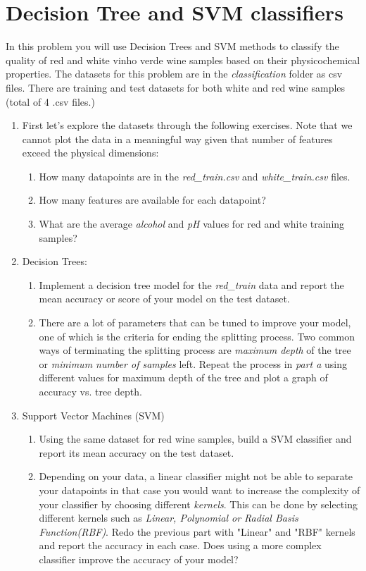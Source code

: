 \documentclass[12pt]{article}
\newenvironment{problem}[2][Problem:]{\begin{trivlist}
\item[\hskip \labelsep {\bfseries #1}\hskip \labelsep {\bfseries #2.}]}{\end{trivlist}}
\begin{document}
\pagebreak


\section{Decision Tree and SVM classifiers}
\begin{problem}{Classification [25 points]}
In this problem you will use Decision Trees and SVM methods to classify the quality of red and white vinho verde wine samples based on their physicochemical properties. The datasets for this problem are in the \textit{classification} folder as csv files. There are training and test datasets for both white and red wine samples (total of 4 .csv files.) 

\begin{enumerate}
	\item First let's explore the datasets through the following exercises. Note that we cannot plot the data in a meaningful way given that  number of features exceed the physical dimensions:
	\begin{enumerate}
		\item How many datapoints are in the \textit{red\_train.csv} and \textit{white\_train.csv} files.
		\item How many features are available for each datapoint?
		\item What are the average \textit{alcohol} and \textit{pH} values for red and white training samples?
	\end{enumerate}
	\item Decision Trees:
	\begin{enumerate}
		\item Implement a decision tree model for the \textit{red\_train} data and report the mean accuracy or score of your model on the test dataset.
		\item There are a lot of parameters that can be tuned to improve your model, one of which is the criteria for ending the splitting process. Two common ways of terminating the splitting process are \textit{maximum depth} of the tree or \textit{minimum number of samples} left. Repeat the process in \textit{part a} using different values for maximum depth of the tree and plot a graph of accuracy vs. tree depth. 
	\end{enumerate}
	\item Support Vector Machines (SVM)
	\begin{enumerate}
		\item Using the same dataset for red wine samples, build a SVM classifier and report its mean accuracy on the test dataset. 
		\item Depending on your data,  a linear classifier might not be able to separate your datapoints in that case you would want to increase the complexity of your classifier by choosing different \textit{kernels}. This can be done by selecting different kernels such as \textit{Linear, Polynomial or Radial Basis Function(RBF)}. Redo the previous part with "Linear" and "RBF" kernels and report the accuracy in each case. Does using a more complex classifier improve the accuracy of your model?
	\end{enumerate}
\end{enumerate}
\end{problem}
\end{document}
